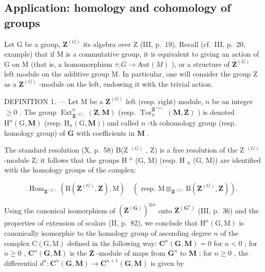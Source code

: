 \subsection{Application: homology and cohomology of groups}

Let G be a group, \(\mathbf{Z}^{(G)}\) its algebra over Z (III, p.~19). Recall (cf.~III, p.~20, example) that if M is a commutative group, it is equivalent to giving an action of G on M (that is, a homomorphism \(\tau: G \to \text{Aut}(M)\) ), or a structure of \(\mathbf{Z}^{(G)}\) left module on the additive group M. In particular, one will consider the group Z as a \(\mathbf{Z}^{(G)}\) -module on the left, endowing it with the trivial action.

DEFINITION 1. --- Let M be a \(\mathbf{Z}^{(G)}\) left (resp. right) module, \(n\) be an integer \(\geqslant 0\) . The group \(\operatorname{Ext}_{\mathbf{Z}^{(G)}}^{n}(\mathbf{Z}, \mathbf{M})\) (resp. \(\operatorname{Tor}_{n}^{\mathbf{Z}^{(G)}}(\mathbf{M}, \mathbf{Z})\) ) is denoted \(\mathrm{H}^{n}(\mathrm{G}, \mathbf{M})\) (resp. \(\mathrm{H}_{n}(\mathrm{G}, \mathbf{M}))\) and called \(n\) -th cohomology group (resp. homology group) of \(\mathbf{G}\) with coefficients in \(\mathbf{M}\) .

The standard resolution (X, p.~58) B(Z \(^{(G)}\) , Z) is a free resolution of the Z \(^{(G)}\) -module Z; it follows that the groups H \(^{n}\) (G, M) (resp. H \(_{n}\) (G, M)) are identified with the homology groups of the complex:

\[
\operatorname{Hom} _ {\mathbf {Z} ^ {(G)}} \left(\mathrm{B} (\mathbf {Z} ^ {(G)}, \mathbf {Z}), \mathrm{M}\right) \quad \left(\text { resp. } \mathrm{M} \otimes_ {\mathbf {Z} ^ {(G)}} \mathrm{B} (\mathbf {Z} ^ {(G)}, \mathbf {Z})\right).
\]

Using the canonical isomorphism of \((\mathbf{Z}^{(\mathbf{G})})^{\otimes n}\) onto \(\mathbf{Z}^{(\mathbf{G}^{n})}\) (III, p.~36) and the properties of extension of scalars (II, p.~82), we conclude that \(\mathrm{H}^n (\mathrm{G},\mathrm{M})\) is canonically isomorphic to the homology group of ascending degree \(n\) of the complex \(\mathrm{C(G,M)}\) defined in the following way: \(\mathbf{C}^n (\mathbf{G},\mathbf{M}) = 0\) for \(n < 0\) ; for \(n\geqslant 0\) , \(\mathbf{C}^n (\mathbf{G},\mathbf{M})\) is the \(\mathbf{Z}\) -module of maps from \(\mathbf{G}^n\) to \(\mathbf{M}\) ; for \(n\geqslant 0\) , the differential \(d^n:\mathbf{C}^n (\mathbf{G},\mathbf{M})\to \mathbf{C}^{n + 1}(\mathbf{G},\mathbf{M})\) is given by

